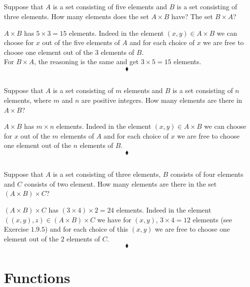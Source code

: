 \subsection{}
\begin{tcolorbox}
Suppose that $A$ is a set consisting of five elements and $B$ is a set consisting of three elements. How many elements does the set $A\times B$ have? The set $B\times A$?
\end{tcolorbox}
$A\times B$ has $5\times 3 =15$ elements. Indeed in the element $(x,y) \in A\times B$  we can choose for $x$ out of the five elements of $A$ and for each choice of $x$ we are free to choose one element out of the $3$ elements of $B$.\\
For $B\times A$, the reasoning is the same and get $3\times 5=15$ elements.
$$\blacklozenge$$

\subsection{}
\begin{tcolorbox}
Suppose that $A$ is a set consisting of $m$ elements and $B$ is a set consisting of $n$ elements, where $m$ and $n$ are positive integers. How many elements are there in  $A\times B$?
\end{tcolorbox}
$A\times B$ has $m\times n $ elements. Indeed in the element $(x,y) \in A\times B$  we can choose for $x$ out of the $m$ elements of $A$ and for each choice of $x$ we are free to choose one element out of the $n$ elements of $B$.
$$\blacklozenge$$

\subsection{}
\begin{tcolorbox}
Suppose that $A$ is a set consisting of three elements, $B$ consists of four elements and $C$ consists of two element. How many elements are there in the set   $(A\times B)\times C$?
\end{tcolorbox}
$(A\times B)\times C$ has $(3\times 4)\times 2 = 24 $ elements. Indeed in the element $\left((x,y), z\right) \in (A\times B)\times C $  we have  for $(x,y)$,  $3\times 4 =12$ elements (see Exercise $1.9.5$) and for each choice of this $(x,y)$ we are free to choose one element out of the $2$ elements of $C$.
$$\blacklozenge$$\newpage

 \section{Functions}
